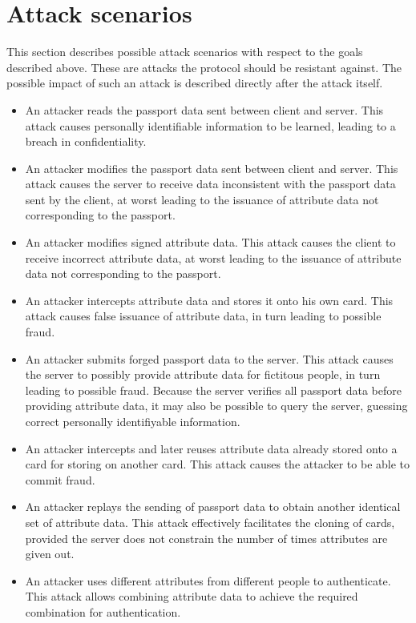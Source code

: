 \section{Attack scenarios}
This section describes possible attack scenarios with respect to the goals described above. These are attacks the protocol should be resistant against. The possible impact of such an attack is described directly after the attack itself.

\begin{itemize}
	\item An attacker reads the passport data sent between client and server. This attack causes personally identifiable information to be learned, leading to a breach in confidentiality. 
  \item An attacker modifies the passport data sent between client and server. This attack causes the server to receive data inconsistent with the passport data sent by the client, at worst leading to the issuance of attribute data not corresponding to the passport.
  \item An attacker modifies signed attribute data. This attack causes the client to receive incorrect attribute data, at worst leading to the issuance of attribute data not corresponding to the passport.
  \item An attacker intercepts attribute data and stores it onto his own card. This attack causes false issuance of attribute data, in turn leading to possible fraud.
  \item An attacker submits forged passport data to the server. This attack causes the server to possibly provide attribute data for fictitous people, in turn leading to possible fraud. Because the server verifies all passport data before providing attribute data, it may also be possible to query the server, guessing correct personally identifiyable information.
  \item An attacker intercepts and later reuses attribute data already stored onto a card for storing on another card. This attack causes the attacker to be able to commit fraud.
  \item An attacker replays the sending of passport data to obtain another identical set of attribute data. This attack effectively facilitates the cloning of cards, provided the server does not constrain the number of times attributes are given out.
  \item An attacker uses different attributes from different people to authenticate. This attack allows combining attribute data to achieve the required combination for authentication. 

\end{itemize}
